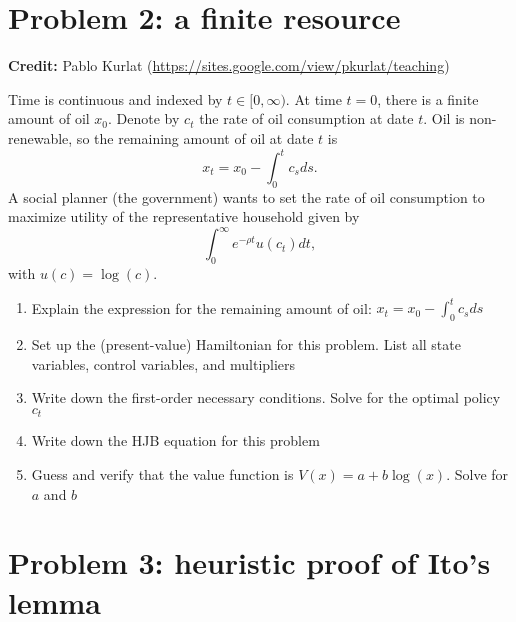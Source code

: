 \documentclass[11pt]{extarticle}
\theoremstyle{plain}
\theoremstyle{definition}
\begin{document}
\vspace{10mm}
\section*{Problem 2: a finite resource}

\textbf{Credit:} Pablo Kurlat (\url{https://sites.google.com/view/pkurlat/teaching})


\vspace{5mm}
\noindent
Time is continuous and indexed by $t \in [0, \infty)$. At time $t=0$, there is a finite amount of oil $x_0$. Denote by $c_t$ the rate of oil consumption at date $t$. Oil is non-renewable, so the remaining amount of oil at date $t$ is 
\begin{equation*}
	x_t = x_0 - \int_0^t c_s ds.
\end{equation*}
A social planner (the government) wants to set the rate of oil consumption to maximize utility of the representative household given by
\begin{equation*}
	\int_0^\infty e^{- \rho t} u(c_t) dt,
\end{equation*}
with $u(c) = \log(c)$. 

\begin{enumerate}
\item Explain the expression for the remaining amount of oil: $x_t = x_0 - \int_0^t c_s ds$

\item Set up the (present-value) Hamiltonian for this problem. List all state variables, control variables, and multipliers

\item Write down the first-order necessary conditions. Solve for the optimal policy $c_t$

\item Write down the HJB equation for this problem

\item Guess and verify that the value function is $V(x) = a + b \log(x)$. Solve for $a$ and $b$
\end{enumerate}




\vspace{10mm}
\section*{Problem 3: heuristic proof of Ito's lemma}
\end{document}
